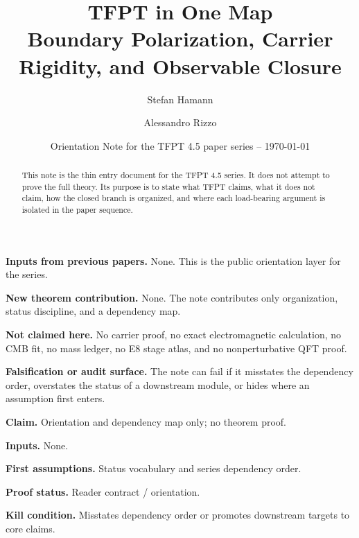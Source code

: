 \documentclass[11pt,a4paper]{article}
\title{\color{tfptblue}\textbf{TFPT in One Map}\\[0.4em]
{\Large Boundary Polarization, Carrier Rigidity, and Observable Closure}}
\author{Stefan Hamann \and Alessandro Rizzo}
\date{{\normalsize\color{tfptgray}\sffamily Orientation Note for the TFPT 4.5 paper series -- \today}}
\begin{document}
\maketitle

\begin{abstract}
This note is the thin entry document for the TFPT 4.5 series. It does not attempt to prove the
full theory. Its purpose is to state what TFPT claims, what it does not claim, how the closed branch
is organized, and where each load-bearing argument is isolated in the paper sequence.
\end{abstract}

\begin{tfptfrontbox}
\textbf{Inputs from previous papers.} None. This is the public orientation layer for the series.

\textbf{New theorem contribution.} None. The note contributes only organization, status discipline,
and a dependency map.

\textbf{Not claimed here.} No carrier proof, no exact electromagnetic calculation, no CMB fit, no
mass ledger, no E8 stage atlas, and no nonperturbative QFT proof.

\textbf{Falsification or audit surface.} The note can fail if it misstates the dependency order,
overstates the status of a downstream module, or hides where an assumption first enters.
\end{tfptfrontbox}


\begin{tfptclaimcontract}
\textbf{Claim.} Orientation and dependency map only; no theorem proof.\par
\textbf{Inputs.} None.\par
\textbf{First assumptions.} Status vocabulary and series dependency order.\par
\textbf{Proof status.} Reader contract / orientation.\par
\textbf{Kill condition.} Misstates dependency order or promotes downstream targets to core claims.\par
\end{tfptclaimcontract}
\end{document}
